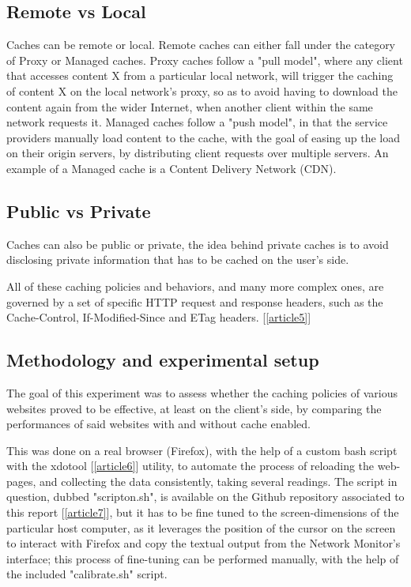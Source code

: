 \documentclass[a4paper,10pt]{article}
\begin{document}
\subsection{Remote vs Local}

Caches can be remote or local. Remote caches can either fall under the category of Proxy or Managed caches. Proxy caches follow a "pull model", where any client that accesses content X from a particular local network, will trigger the caching of content X on the local network's proxy, so as to avoid having to download the content again from the wider Internet, when another client within the same network requests it. Managed caches follow a "push model", in that the service providers manually load content to the cache, with the goal of easing up the load on their origin servers, by distributing client requests over multiple servers. An example of a Managed cache is a Content Delivery Network (CDN).

\subsection{Public vs Private}

Caches can also be public or private, the idea behind private caches is to avoid disclosing private information that has to be cached on the user's side.

All of these caching policies and behaviors, and many more complex ones, are governed by a set of specific HTTP request and response headers, such as the Cache-Control, If-Modified-Since and ETag headers. [\ref{article5}] 

\subsection{Methodology and experimental setup}

The goal of this experiment was to assess whether the caching policies of various websites proved to be effective, at least on the client's side, by comparing the performances of said websites with and without cache enabled. 

This was done on a real browser (Firefox), with the help of a custom bash script with the xdotool [\ref{article6}] utility, to automate the process of reloading the web-pages, and collecting the data consistently, taking several readings. The script in question, dubbed "scripton.sh", is available on the Github repository associated to this report [\ref{article7}], but it has to be fine tuned to the screen-dimensions of the particular host computer, as it leverages the position of the cursor on the screen to interact with Firefox and copy the textual output from the Network Monitor's interface; this process of fine-tuning can be performed manually, with the help of the included "calibrate.sh" script. 
\end{document}
